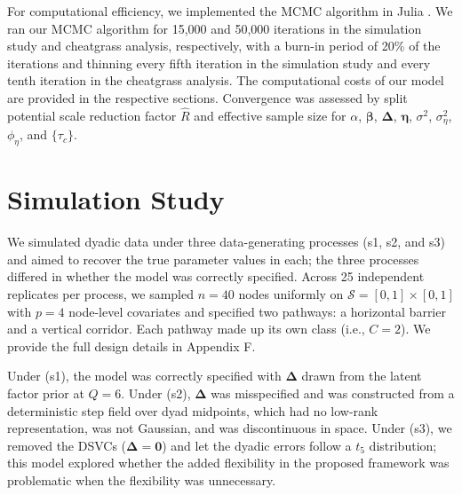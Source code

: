 \documentclass{article}
\begin{document}
For computational efficiency, we implemented the MCMC algorithm in Julia \citep{bezanson2018julia}.
We ran our MCMC algorithm for 15,000 and 50,000 iterations in the simulation study and cheatgrass analysis, respectively, with a burn-in period of 20\% of the iterations and thinning every fifth iteration in the simulation study and every tenth iteration in the cheatgrass analysis. The computational costs of our model are provided in the respective sections.
Convergence was assessed by split potential scale reduction factor $\widehat{R}$ and effective sample size \citep[ESS;][]{gelman1995bayesian} for $\alpha$, $\boldsymbol{\beta}$, $\boldsymbol{\Delta}$, $\boldsymbol{\eta}$, $\sigma^2$, $\sigma^2_\eta$, $\phi_\eta$, and $\{\tau_c\}$.

\section{Simulation Study}

We simulated dyadic data under three data-generating processes (s1, s2, and s3) and aimed to recover the true parameter values in each; the three processes differed in whether the model was correctly specified. Across 25 independent replicates per process, we sampled $n=40$ nodes uniformly on $\mathcal{S}=[0,1]\times[0,1]$ with $p=4$ node-level covariates and specified two pathways: a horizontal barrier and a vertical corridor. Each pathway made up its own class (i.e., $C=2$). We provide the full design details in Appendix F. %

Under (s1), the model was correctly specified with $\boldsymbol{\Delta}$ drawn from the latent factor prior at $Q=6$. Under (s2), $\boldsymbol{\Delta}$ was misspecified and was constructed from a deterministic step field over dyad midpoints, which had no low-rank representation, was not Gaussian, and was discontinuous in space. Under (s3), we removed the DSVCs ($\boldsymbol{\Delta}=\boldsymbol{0}$) and let the dyadic errors follow a $t_5$ distribution; this model explored whether the added flexibility in the proposed framework was problematic when the flexibility was unnecessary.
\end{document}
